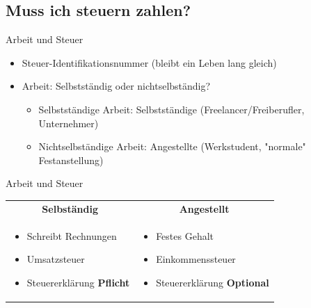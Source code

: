 \documentclass{beamer}
\begin{document}
		\begin{frame}
		\end{frame}
	
		\subsection{Muss ich steuern zahlen?}
		
			\begin{frame}{Arbeit und Steuer}
				\begin{itemize}
					\item Steuer-Identifikationsnummer (bleibt ein Leben lang gleich)
					\item Arbeit: Selbstständig oder nichtselbständig?
					\begin{itemize}
						\item Selbstständige Arbeit: Selbstständige (Freelancer/Freiberufler, Unternehmer)
						\item Nichtselbständige Arbeit: Angestellte (Werkstudent, "normale" Festanstellung)
					\end{itemize}
				\end{itemize}
			\end{frame}
		
			\begin{frame}{Arbeit und Steuer}
				\begin{tabularx}{\linewidth}{X|X}
					\multicolumn{1}{c|}{\textbf{Selbständig}} &
					\multicolumn{1}{c}{\textbf{Angestellt}} \\[0.25cm]
					\begin{itemize}
						\item Schreibt Rechnungen
						\item Umsatzsteuer
						\item Steuererklärung \textbf{Pflicht}
					\end{itemize} &
					\begin{itemize}
						\item Festes Gehalt
						\item Einkommenssteuer
						\item Steuererklärung \textbf{Optional}
					\end{itemize}
				\end{tabularx}
			\end{frame}
		
\end{document}
